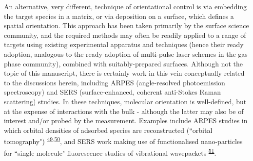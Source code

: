 \documentclass[10pt]{article}
\begin{document}
An alternative, very different, technique of orientational control is via embedding the target species in a matrix, or via deposition on a surface, which defines a spatial orientation. This approach has been taken primarily by the surface science community, and the required methods may often be readily applied to a range of targets using existing experimental apparatus and techniques (hence their ready adoption, analogous to the ready adoption of multi-pulse laser schemes in the gas phase community), combined with suitably-prepared surfaces. Although not the topic of this manuscript, there is certainly work in this vein conceptually related to the discussions herein, including ARPES (angle-resolved photoemission spectroscopy) and SERS (surface-enhanced, coherent anti-Stokes Raman scattering) studies. In these techniques, molecular orientation is well-defined, but at the expense of interactions with the bulk - although the latter may also be of interest and/or probed by the measurement. 
Examples include ARPES studies in which orbital densities of adsorbed species are reconstructed (``orbital tomography") \textsuperscript{\hyperref[csl:49]{49},\hyperref[csl:50]{50}}, and SERS work making use of functionalised nano-particles for ``single molecule" fluorescence studies of vibrational wavepackets \textsuperscript{\hyperref[csl:51]{51}}. 




\end{document}
